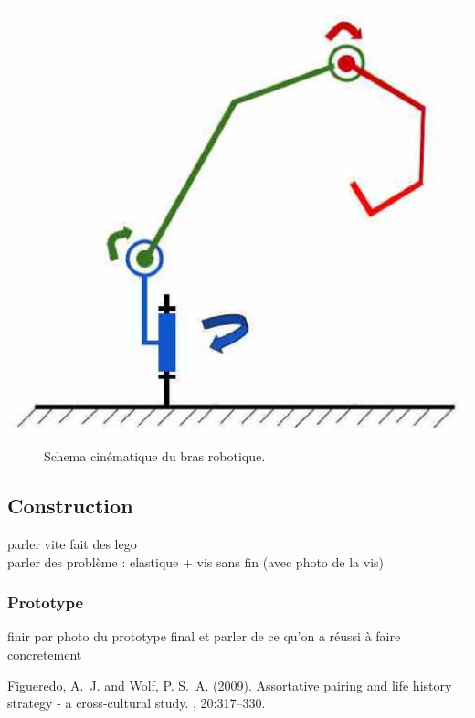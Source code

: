 \documentclass[twoside,twocolumn, 16pt]{article}
\begin{document}
\begin{center}
\includegraphics[scale = 0.3]{cin.eps}
\begin{figure}[!h]
\caption{Schema cinématique du bras robotique.}
\end{figure}
\end{center}

\subsection{Construction}
parler vite fait des lego \\
parler des problème : elastique + vis sans fin (avec photo de la vis)

\subsubsection{Prototype}
finir par photo du prototype final
et parler de ce qu'on a réussi à faire concretement


\begin{thebibliography}{99} %

Figueredo, A.~J. and Wolf, P. S.~A. (2009).
\newblock Assortative pairing and life history strategy - a cross-cultural
  study.
, 20:317--330.
 
\end{thebibliography}

\end{document}
